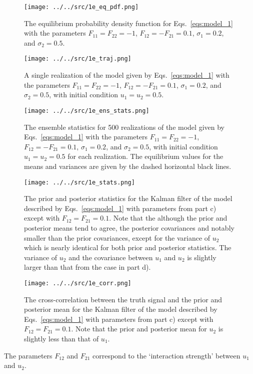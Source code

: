 \begin{enumerate}[a)]
	\begin{figure}[H]
		\centering
		\texttt{[image: ../../src/1e\_eq\_pdf.png]}
		\caption{The equilibrium probability density function for Eqs.~\ref{eqs:model_1} with the parameters $F_{11} = F_{22} = -1$, $F_{12} = -F_{21} = 0.1$, $\sigma_1 = 0.2$, and $\sigma_2 = 0.5$.}
		\label{fig:1e_eq_pdf}
	\end{figure}
	
	\begin{figure}[H]
		\centering
		\texttt{[image: ../../src/1e\_traj.png]}
		\caption{A single realization of the model given by Eqs.~\ref{eqs:model_1} with the parameters $F_{11} = F_{22} = -1$, $F_{12} = -F_{21} = 0.1$, $\sigma_1 = 0.2$, and $\sigma_2 = 0.5$, with initial condition $u_1 = u_2 = 0.5$.}
		\label{fig:1e_traj}
	\end{figure}
	
	\begin{figure}[H]
		\centering
		\texttt{[image: ../../src/1e\_ens\_stats.png]}
		\caption{The ensemble statistics for 500 realizations of the model given by Eqs.~\ref{eqs:model_1} with the parameters $F_{11} = F_{22} = -1$, $F_{12} = -F_{21} = 0.1$, $\sigma_1 = 0.2$, and $\sigma_2 = 0.5$, with initial condition $u_1 = u_2 = 0.5$ for each realization. The equilibrium values for the means and variances are given by the dashed horizontal black lines.}
		\label{fig:1e_ens_stats}
	\end{figure}
	
	\begin{figure}[H]
		\centering
		\texttt{[image: ../../src/1e\_stats.png]}
		\caption{The prior and posterior statistics for the Kalman filter of the model described by Eqs.~\ref{eqs:model_1} with parameters from part c) except with $F_{12} = F_{21} = 0.1$. Note that the although the prior and posterior means tend to agree, the posterior covariances and notably smaller than the prior covariances, except for the variance of $u_2$ which is nearly identical for both prior and posterior statistics. The variance of $u_2$ and the covariance between $u_1$ and $u_2$ is slightly larger than that from the case in part d).}
		\label{fig:1e_stats}
	\end{figure}
	
	\begin{figure}[H]
		\centering
		\texttt{[image: ../../src/1e\_corr.png]}
		\caption{The cross-correlation between the truth signal and the prior and posterior mean for the Kalman filter of the model described by Eqs.~\ref{eqs:model_1} with parameters from part c) except with $F_{12} = F_{21} = 0.1$. Note that the prior and posterior mean for $u_2$ is slightly less than that of $u_1$.}
		\label{fig:1e_corr}
	\end{figure}
	
	The parameters $F_{12}$ and $F_{21}$ correspond to the `interaction strength' between $u_1$ and $u_2$.
	
\end{enumerate}
